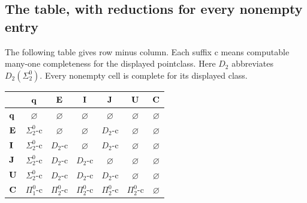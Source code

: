 \subsection{The table, with reductions for every nonempty entry}
\begin{theorem}\label{thm:differences}
The following table gives row minus column. Each suffix c means computable many-one completeness for the displayed pointclass. Here $D_2$ abbreviates $D_2(\Sigma^0_2)$. Every nonempty cell is complete for its displayed class.
\begin{center}\small
\setlength{\tabcolsep}{5pt}
\begin{tabular}{@{}lcccccc@{}}
\toprule & $\mathbf q$&$\mathbf E$&$\mathbf I$&$\mathbf J$&$\mathbf U$&$\mathbf C$\\\midrule
$\mathbf q$&$\varnothing$&$\varnothing$&$\varnothing$&$\varnothing$&$\varnothing$&$\varnothing$\\
$\mathbf E$&$\Sigma^0_2$-c&$\varnothing$&$\varnothing$&$D_2$-c&$\varnothing$&$\varnothing$\\
$\mathbf I$&$\Sigma^0_2$-c&$D_2$-c&$\varnothing$&$D_2$-c&$\varnothing$&$\varnothing$\\
$\mathbf J$&$\Sigma^0_2$-c&$D_2$-c&$D_2$-c&$\varnothing$&$\varnothing$&$\varnothing$\\
$\mathbf U$&$\Sigma^0_2$-c&$D_2$-c&$D_2$-c&$D_2$-c&$\varnothing$&$\varnothing$\\
$\mathbf C$&$\Pi^0_1$-c&$\Pi^0_2$-c&$\Pi^0_2$-c&$\Pi^0_2$-c&$\Pi^0_2$-c&$\varnothing$\\\bottomrule
\end{tabular}
\end{center}
\end{theorem}
